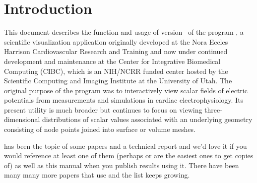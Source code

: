 \section{Introduction}

This document describes the function and usage of version~\version{} of the
program \map{}, a scientific visualization application originally developed
at the Nora Eccles Harrison Cardiovascular Research and Training
 and now under
continued development and maintenance at the Center for Integrative
Biomedical Computing (CIBC), which is an NIH/NCRR funded center hosted by
the Scientific Computing and Imaging Institute
 at the University of
Utah.  The original purpose of the program was to interactively view scalar
fields of electric potentials from measurements and simulations in cardiac
electrophysiology.  Its present utility is much broader but continues to
focus on viewing three-dimensional distributions of scalar values
associated with an underlying geometry consisting of node points joined
into surface or volume meshes.

\map{} has been the topic of some papers
\cite{RSM:Mac92c,RSM:Mac92d,RSM:Mac93,RSM:Mac93a} and a technical report
\cite{RSM:Mac94d} and we'd love it if you would reference at least one of
them (perhaps \cite{RSM:Mac93} or \cite{RSM:Mac93a} are the easiest ones to
get copies of) as well as this manual when you publish results using it.
There have been many many more papers that use \map{} and the list keeps
growing.\cite{RSM:Mac93,RSM:Mac93a,RSM:Mac94d,RSM:Mac94c,RSM:Mac94f,RSM:Mac95d,RSM:Mac97,RSM:Mac98,RSM:Mac2000a,RSM:Mac2001,RSM:Pun98,RSM:Pun99,RSM:Tac92,RSM:Tac92b,RSM:Tac94,RSM:Tac96,RSM:Tac96b,RSM:Tac97b,RSM:Ni98,RSM:Ni99,RSM:Ni2000b,RSM:Lux96,RSM:Lux2001,CRJ:Joh93b,CRJ:Joh93d,CRJ:Joh94,CRJ:Joh94b,RSM:Pun2003,RSM:Ser2002}

